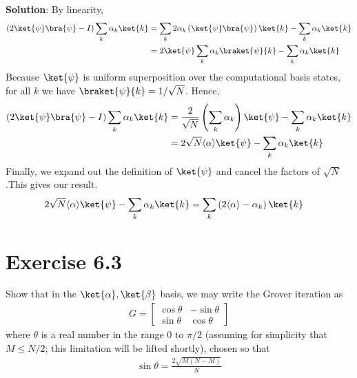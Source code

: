 \documentclass{book}
\begin{document}
    \textbf{Solution}: By linearity,
    \begin{align*}
        (2\ket{\psi}\bra{\psi}-I)\sum_k \alpha_k\ket{k} &= \sum_k 2 \alpha_k\left(\ket{\psi}\bra{\psi}\right)\ket{k} - \sum_k \alpha_k\ket{k} \\
        &= 2\ket{\psi}\sum_k\alpha_k\braket{\psi}{k}-\sum_k\alpha_k\ket{k}
    \end{align*}
    Because $\ket{\psi}$ is uniform superposition over the computational basis states, for all $k$ we have $\braket{\psi}{k}=1/\sqrt{N}$. Hence,
    \begin{align}
    (2\ket{\psi}\bra{\psi}-I)\sum_k \alpha_k\ket{k} &= \frac{2}{\sqrt{N}}\left(\sum_k\alpha_k\right)\ket{\psi} - \sum_k \alpha_k\ket{k} \\
    &= 2\sqrt{N} \langle\alpha\rangle\ket{\psi} - \sum_k\alpha_k\ket{k}
    \end{align}
    Finally, we expand out the definition of $\ket{\psi}$ and cancel the factors of $\sqrt{N}$.This gives our result. 
    \begin{align}
        2\sqrt{N} \langle\alpha\rangle\ket{\psi} - \sum_k\alpha_k\ket{k} &= \sum_k\left(2\langle\alpha\rangle-\alpha_k\right)\ket{k}
    \end{align}

\section*{Exercise 6.3}
    Show that in the $\ket{\alpha}, \ket{\beta}$ basis, we may write the Grover iteration as
    \begin{align}
        G = 
        \begin{bmatrix} \label{eq:matrix_G}
            \cos\theta & -\sin\theta \\
            \sin\theta & \cos\theta
        \end{bmatrix}
    \end{align}
    where $\theta$ is a real number in the range 0 to $\pi/2$ (assuming for simplicity that $M\leq N/2$; this limitation will be lifted shortly), chosen so that
    \begin{align} \label{eq:theta_value}
        \sin\theta =\frac{2\sqrt{M(N-M)}}{N}
    \end{align}
    
\end{document}
